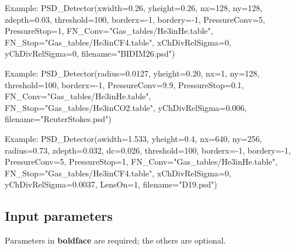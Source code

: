 Example: PSD\_Detector(xwidth=0.26, yheight=0.26, nx=128, ny=128, zdepth=0.03, threshold=100, borderx=-1, bordery=-1, PressureConv=5, PressureStop=1, FN\_Conv="Gas\_tables/He3inHe.table", FN\_Stop="Gas\_tables/He3inCF4.table", xChDivRelSigma=0, yChDivRelSigma=0, filename="BIDIM26.psd")

Example: PSD\_Detector(radius=0.0127, yheight=0.20, nx=1, ny=128, threshold=100, borderx=-1, PressureConv=9.9, PressureStop=0.1, FN\_Conv="Gas\_tables/He3inHe.table", FN\_Stop="Gas\_tables/He3inCO2.table", yChDivRelSigma=0.006, filename="ReuterStokes.psd")

Example: PSD\_Detector(awidth=1.533, yheight=0.4, nx=640, ny=256, radius=0.73, zdepth=0.032, dc=0.026, threshold=100, borderx=-1, bordery=-1, PressureConv=5, PressureStop=1, FN\_Conv="Gas\_tables/He3inHe.table", FN\_Stop="Gas\_tables/He3inCF4.table", xChDivRelSigma=0, yChDivRelSigma=0.0037, LensOn=1, filename="D19.psd")

\subsection*{Input parameters}
Parameters in \textbf{boldface} are required; the others are optional.

